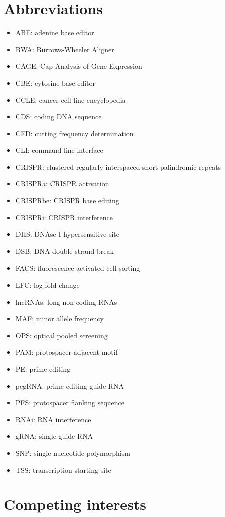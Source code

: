 \documentclass[pdftex,english,10pt]{article}
\begin{document}
{%
\section*{Abbreviations}


\begin{itemize}
\item ABE: adenine base editor
\item BWA: Burrows-Wheeler Aligner
\item CAGE: Cap Analysis of Gene Expression
\item CBE: cytosine base editor
\item CCLE: cancer cell line encyclopedia
\item CDS: coding DNA sequence
\item CFD: cutting frequency determination
\item CLI: command line interface
\item CRISPR: clustered regularly interspaced short palindromic repeats
\item CRISPRa: CRISPR activation
\item CRISPRbe: CRISPR  base editing
\item CRISPRi: CRISPR interference
\item DHS: DNAse I hypersensitive site
\item DSB: DNA double-strand break
\item FACS: fluorescence-activated cell sorting
\item LFC: log-fold change
\item lncRNAs: long non-coding RNAs
\item MAF: minor allele frequency
\item OPS: optical pooled screening
\item PAM: protospacer adjacent motif
\item PE: prime editing
\item pegRNA: prime editing guide RNA
\item PFS: protospacer flanking sequence
\item RNAi: RNA interference
\item gRNA: single-guide RNA
\item SNP: single-nucleotide polymorphism
\item TSS: transcription starting site
\end{itemize}


\section*{Competing interests}

}
\end{document}
